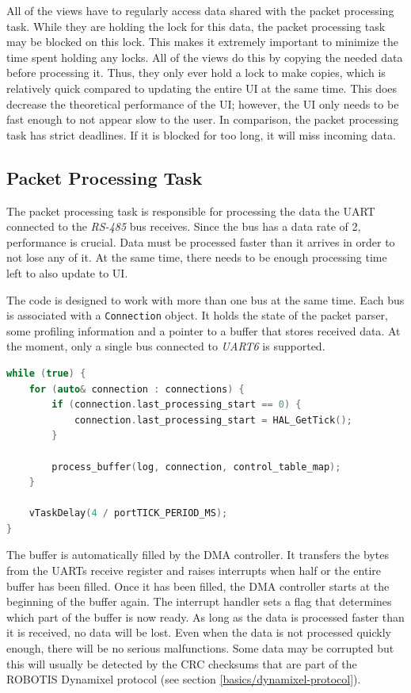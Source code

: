 All of the views have to regularly access data shared with the packet processing task. While they
are holding the lock for this data, the packet processing task may be blocked on this lock. This
makes it extremely important to minimize the time spent holding any locks. All of the views do this
by copying the needed data before processing it. Thus, they only ever hold a lock to make copies,
which is relatively quick compared to updating the entire UI at the same time. This does decrease
the theoretical performance of the UI; however, the UI only needs to be fast enough to not appear
slow to the user. In comparison, the packet processing task has strict deadlines. If it is blocked
for too long, it will miss incoming data.

\subsection{Packet Processing Task}
\label{implementation/software/packet-processing-task}

The packet processing task is responsible for processing the data the UART connected to the \textit{RS-485}
bus receives. Since the bus has a data rate of \SI{2}{}, performance is crucial. Data must be
processed faster than it arrives in order to not lose any of it. At the same time, there needs to be
enough processing time left to also update to UI.

The code is designed to work with more than one bus at the same time. Each bus is associated with
a \lstinline{Connection} object. It holds the state of the packet parser, some profiling information
and a pointer to a buffer that stores received data. At the moment, only a single bus connected to
\textit{UART6} is supported.

\begin{lstlisting}[language=C++, caption={Main loop of the packet processing task}]
while (true) {
    for (auto& connection : connections) {
        if (connection.last_processing_start == 0) {
            connection.last_processing_start = HAL_GetTick();
        }

        process_buffer(log, connection, control_table_map);
    }

    vTaskDelay(4 / portTICK_PERIOD_MS);
}
\end{lstlisting}

The buffer is automatically filled by the DMA controller. It transfers the bytes from the UARTs
receive register and raises interrupts when half or the entire buffer has been filled. Once it has
been filled, the DMA controller starts at the beginning of the buffer again. The interrupt handler
sets a flag that determines which part of the buffer is now ready. As long as the data is processed
faster than it is received, no data will be lost. Even when the data is not processed quickly enough,
there will be no serious malfunctions. Some data may be corrupted but this will usually be detected
by the CRC checksums that are part of the ROBOTIS Dynamixel protocol (see section \ref{basics/dynamixel-protocol}).

